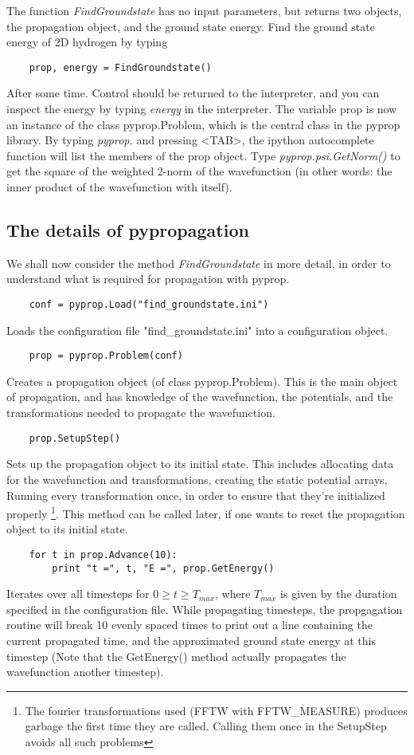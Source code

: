 \documentclass[a4paper,12pt]{report}
\begin{document}
The function \textit{FindGroundstate} has no input parameters, but returns two objects, the propagation object, and the 
ground state energy. Find the ground state energy of 2D hydrogen by typing
\begin{verbatim}
	prop, energy = FindGroundstate()
\end{verbatim}
After some time. Control should be returned to the interpreter, and you can inspect the energy by typing \textit{energy} in
the interpreter. The variable prop is now an instance of the class pyprop.Problem, which is the central class in the
pyprop library. By typing \textit{pyprop.} and pressing <TAB>, the ipython autocomplete function will list the members of
the prop object. Type \textit{pyprop.psi.GetNorm()} to get the square of the weighted 2-norm of the wavefunction (in other 
words: the inner product of the wavefunction with itself).

\subsection{The details of pypropagation}
We shall now consider the method \textit{FindGroundstate} in more detail, in order to understand what is required for 
propagation with pyprop.
\begin{verbatim}
	conf = pyprop.Load("find_groundstate.ini")
\end{verbatim}
Loads the configuration file "find\_groundstate.ini" into a configuration object. 
\begin{verbatim}
	prop = pyprop.Problem(conf)
\end{verbatim}
Creates a propagation object (of class pyprop.Problem). This is the main object of propagation, and has knowledge of 
the wavefunction, the potentials, and the transformations needed to propagate the wavefunction. 
\begin{verbatim}
	prop.SetupStep()
\end{verbatim}
Sets up the propagation object to its initial state. This includes allocating data for the wavefunction and transformations,
creating the static potential arrays, Running every transformation once, in order to ensure that they're initialized properly
\footnote{The fourier transformations used (FFTW with FFTW\_MEASURE) produces garbage the first time they are called. Calling
them once in the SetupStep avoids all such problems}. This method can be called later, if one wants to reset the propagation
object to its initial state.
\begin{verbatim}
	for t in prop.Advance(10):
	    print "t =", t, "E =", prop.GetEnergy()
\end{verbatim}
Iterates over all timesteps for $0 \ge t \ge T_{max}$, where $T_{max}$ is given by the duration specified in the 
configuration file. While propagating timesteps, the propgagation routine will break 10 evenly spaced times to print
out a line containing the current propagated time, and the approximated ground state energy at this timestep (Note 
that the GetEnergy() method actually propagates the wavefunction another timestep).
\end{document}
